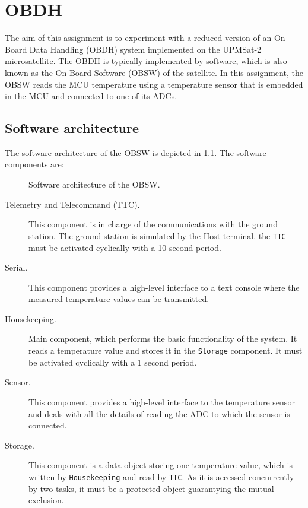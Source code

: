 \chapter{OBDH}\label{ch:obdh}

The aim of this assignment is to experiment with
a reduced version of an On-Board Data Handling (OBDH) system
implemented on the UPMSat-2 microsatellite.
The OBDH is typically implemented by software,
which is also known as the On-Board Software (OBSW) of the satellite.
In this assignment,
the OBSW reads the MCU temperature using a temperature sensor
that is embedded in the MCU and connected to one of its ADCs.

\section{Software architecture}

The software architecture of the OBSW is depicted in \ref{fig:obdh}.
The software components are:

\begin{figure}[h]
	\caption{Software architecture of the OBSW.}
	\label{fig:obdh}
\end{figure}

\begin{description}
\item[Telemetry and Telecommand (TTC).] This component is in charge of the communications with the ground station. The ground station is simulated by the Host terminal. the \texttt{TTC} must be activated cyclically with a 10 second period.

\item[Serial.] This component provides a high-level interface to a text console
where the measured temperature values can be transmitted.

\item[Housekeeping.] Main component,
which performs the basic functionality of the system.
It reads a temperature value and stores it in the \texttt{Storage} component.
It must be activated cyclically with a 1 second period.

\item[Sensor.] This component provides a high-level interface to the temperature sensor and deals with all the details of reading the ADC to which the sensor is connected.

\item[Storage.] This component is a data object storing one temperature value, which is written by \texttt{Housekeeping} and read by \texttt{TTC}. As it is accessed concurrently by two tasks, it must be a protected object guarantying the mutual exclusion.

\end{description}

